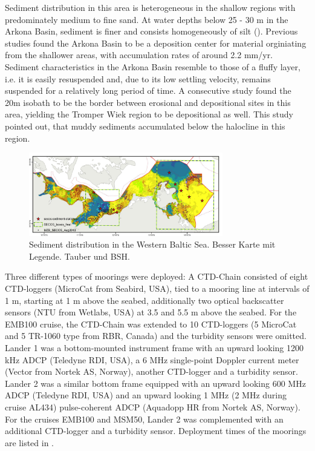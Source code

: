Sediment distribution in this area is heterogeneous in the shallow regions with 
predominately medium to fine sand. At water depths below 25 - 30 m in the 
Arkona Basin, sediment is finer and consists homogeneously of silt 
(). Previous studies \citep[][]{leipe2000, basys1} found 
the Arkona Basin to be a deposition center for material orginiating from the 
shallower areas, with accumulation rates of around 2.2 mm/yr. Sediment 
characteristics in the Arkona Basin resemble to those of a fluffy layer, i.e. 
it is easily resuspended and, due to its low settling velocity, remains 
suspended for a relatively long period of time. A consecutive study 
\citep[][]{basys2} found the 20m isobath to be the border between erosional and 
depositional sites in this area, yielding the Tromper Wiek region to be 
depositional as well. This study pointed out, that muddy sediments accumulated 
below the halocline in this region.
 \begin{figure}[ht]
\includegraphics[width=20pc]{bilder/bild.png}
 \caption{Sediment distribution in the Western Baltic Sea. Besser Karte mit 
Legende. Tauber und BSH.}
 \label{tauberkarte}
 \end{figure}

Three different types of moorings were deployed: A CTD-Chain consisted of eight 
CTD-loggers (MicroCat from Seabird, USA), tied to a mooring line at intervals 
of 1 m, starting at 1 m above the seabed, additionally two optical 
backscatter sensors (NTU from Wetlabs, USA) at 3.5 and 5.5 m above the seabed. 
For the EMB100 cruise, the CTD-Chain was extended to 10 CTD-loggers (5 MicroCat 
and 5 TR-1060 type from RBR, Canada) and the turbidity sensors were omitted. 
Lander 1 was a bottom-mounted instrument frame with an upward looking 1200 kHz 
ADCP (Teledyne RDI, USA), a 6 MHz single-point Doppler current meter (Vector 
from Nortek AS, Norway), another CTD-logger and a turbidity sensor. Lander 2 
was a similar bottom frame equipped with an upward looking 600 MHz ADCP 
(Teledyne RDI, USA) and an upward looking 1 MHz (2 MHz during cruise AL434) 
pulse-coherent ADCP (Aquadopp HR from Nortek AS, Norway). For the cruises 
EMB100 and MSM50, Lander 2 was complemented with an additional CTD-logger and a 
turbidity sensor. Deployment times of the moorings are listed in 
.

